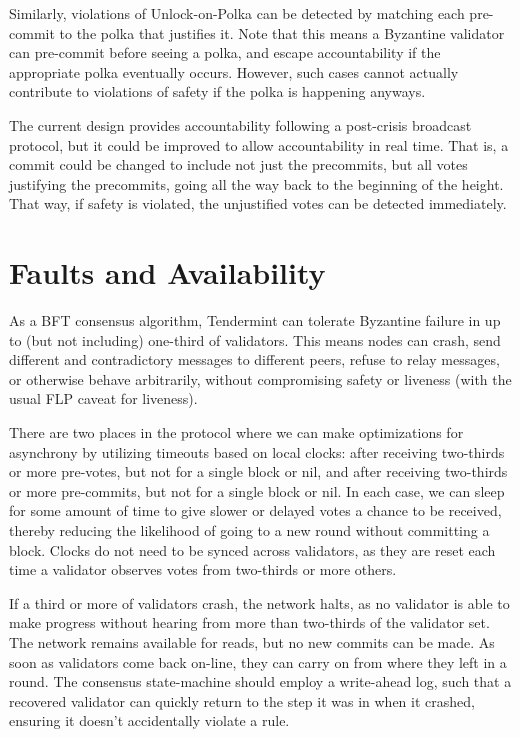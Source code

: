 Similarly, violations of Unlock-on-Polka can be detected by matching each pre-commit
to the polka that justifies it. 
Note that this means a Byzantine validator can pre-commit before seeing a polka,
and escape accountability if the appropriate polka eventually occurs.
However, such cases cannot actually contribute to violations of safety 
if the polka is happening anyways.

The current design provides accountability following a post-crisis broadcast protocol,
but it could be improved to allow accountability in real time. 
That is, a commit could be changed to include not just the precommits, but all votes 
justifying the precommits, going all the way back to the beginning of the height.
That way, if safety is violated, the unjustified votes can be detected immediately.

\section{Faults and Availability}

As a BFT consensus algorithm, Tendermint can tolerate Byzantine failure in up to 
(but not including) one-third of validators.
This means nodes can crash, send different and contradictory messages to different peers, 
refuse to relay messages, or otherwise behave arbitrarily,
without compromising safety or liveness (with the usual FLP caveat for liveness).

There are two places in the protocol where we can make optimizations 
for asynchrony by utilizing timeouts based on local clocks:
after receiving two-thirds or more pre-votes, but not for a single block or nil, 
and after receiving two-thirds or more pre-commits, 
but not for a single block or nil.
In each case, we can sleep for some amount of time to give slower or delayed votes a chance to be received,
thereby reducing the likelihood of going to a new round without committing a block.
Clocks do not need to be synced across validators, 
as they are reset each time a validator observes votes from two-thirds or more others.

If a third or more of validators crash, the network halts, 
as no validator is able to make progress without hearing from more than two-thirds of the validator set.
The network remains available for reads, but no new commits can be made.
As soon as validators come back on-line, they can carry on from where they left in a round. 
The consensus state-machine should employ a write-ahead log,
such that a recovered validator can quickly return to the step it was in when it crashed,
ensuring it doesn't accidentally violate a rule.

